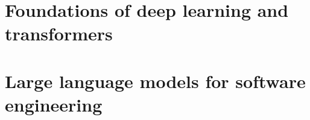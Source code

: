 \documentclass[11pt,a4paper,oneside,openany]{book}
\begin{document}
\frontmatter

\tableofcontents

\mainmatter

\part{Foundations of deep learning and transformers}



% 
% 
% 

\part{Large language models for software engineering}

% 
% 
% 
% 
% 

\backmatter


\end{document}
